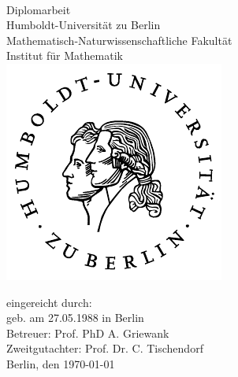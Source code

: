\begin{spacing}{1}
\begin{titlepage}
\begin{otherlanguage}{ngerman}
\enlargethispage{4\baselineskip}
\vspace{3cm}
\begin{center}
	\Huge{\bfseries\thetitle}\\[1cm]
	\LARGE{Diplomarbeit}\\[1cm]
	\normalsize{
	Humboldt-Universität zu Berlin\\
	Mathematisch-Naturwissenschaftliche Fakultät \\
	Institut für Mathematik\\[1cm]
	}
	\includegraphics[height=0.3\textheight]{img/plain/husiegel.pdf}\\[0.5cm]
\end{center}
\vfill

\begin{flushleft}
\large{
eingereicht durch: \theauthor\\
geb. am 27.05.1988  in Berlin\\
Betreuer: Prof. PhD A. Griewank\\
Zweitgutachter: Prof. Dr. C. Tischendorf\\
Berlin, den \today
}
\end{flushleft}
\end{otherlanguage}
\end{titlepage}
\end{spacing}